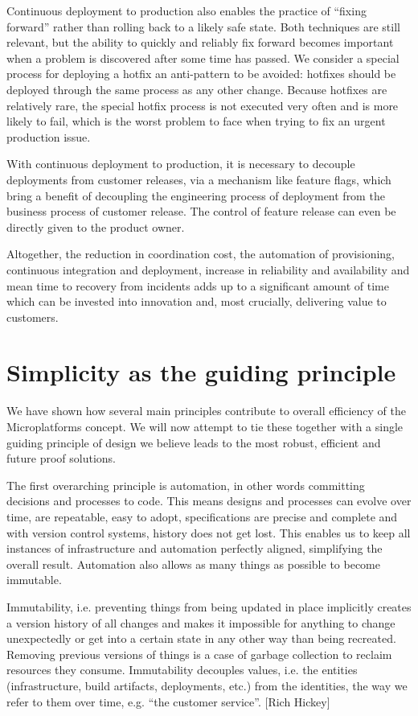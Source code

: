 \documentclass[reprint,amsmath,amssymb,aps]{revtex4-1}
\begin{document}
Continuous deployment to production also enables the practice of “fixing forward” rather than rolling back to a likely safe state. Both techniques are still relevant, but the ability to quickly and reliably fix forward becomes important when a problem is discovered after some time has passed. We consider a special process for deploying a hotfix an anti-pattern to be avoided: hotfixes should be deployed through the same process as any other change. Because hotfixes are relatively rare, the special hotfix process is not executed very often and is more likely to fail, which is the worst problem to face when trying to fix an urgent production issue.

With continuous deployment to production, it is necessary to decouple deployments from customer releases, via a mechanism like feature flags, which bring a benefit of decoupling the engineering process of deployment from the business process of customer release. The control of feature release can even be directly given to the product owner.

Altogether, the reduction in coordination cost, the automation of provisioning, continuous integration and deployment, increase in reliability and availability and mean time to recovery from incidents adds up to a significant amount of time which can be invested into innovation and, most crucially, delivering value to customers.


\section{\label{sec:simplicity}Simplicity as the guiding principle}

We have shown how several main principles contribute to overall efficiency of the Microplatforms concept. We will now attempt to tie these together with a single guiding principle of design we believe leads to the most robust, efficient and future proof solutions.

The first overarching principle is automation, in other words committing decisions and processes to code. This means designs and processes can evolve over time, are repeatable, easy to adopt, specifications are precise and complete and with version control systems, history does not get lost. This enables us to keep all instances of infrastructure and automation perfectly aligned, simplifying the overall result. Automation also allows as many things as possible to become immutable.

Immutability, i.e. preventing things from being updated in place implicitly creates a version history of all changes and makes it impossible for anything to change unexpectedly or get into a certain state in any other way than being recreated. Removing previous versions of things is a case of garbage collection to reclaim resources they consume. Immutability decouples values, i.e. the entities (infrastructure, build artifacts, deployments, etc.) from the identities, the way we refer to them over time, e.g. “the customer service”. [Rich Hickey]
\end{document}
